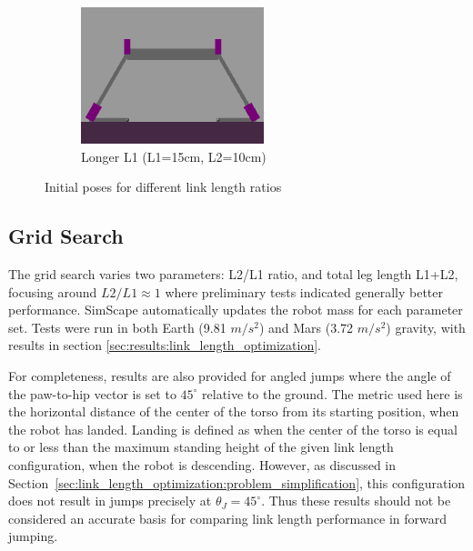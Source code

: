 \begin{figure}[h]
\begin{subfigure}[b]{0.32\textwidth}
    \end{subfigure}
    \hfill
    \begin{subfigure}[b]{0.32\textwidth}
        \centering
        \includegraphics[width=\textwidth]{Images/link_length_optimization/longer_L1_pose.png}
        \caption{Longer L1 (L1=15cm, L2=10cm)}
        \label{fig:link_length_optimization:longer_L1_pose}
    \end{subfigure}
    \caption{Initial poses for different link length ratios}
    \label{fig:link_length_optimization:initial_poses}
\end{figure}



\subsection{Grid Search}
The grid search varies two parameters: L2/L1 ratio, and total leg length L1+L2, focusing around $L2/L1\approx1$ where preliminary tests indicated generally better performance. SimScape automatically updates the robot mass for each parameter set. Tests were run in both Earth (9.81 $m/s^2$) and Mars (3.72 $m/s^2$) gravity, with results in section \ref{sec:results:link_length_optimization}.

For completeness, results are also provided for angled jumps where the angle of the paw-to-hip vector is set to \(45^{\circ}\) relative to the ground. The metric used here is the horizontal distance of the center of the torso from its starting position, when the robot has landed. Landing is defined as when the center of the torso is equal to or less than the maximum standing height of the given link length configuration, when the robot is descending. However, as discussed in Section~\ref{sec:link_length_optimization:problem_simplification}, this configuration does not result in jumps precisely at \(\theta_J = 45^{\circ}\). Thus these results should not be considered an accurate basis for comparing link length performance in forward jumping.